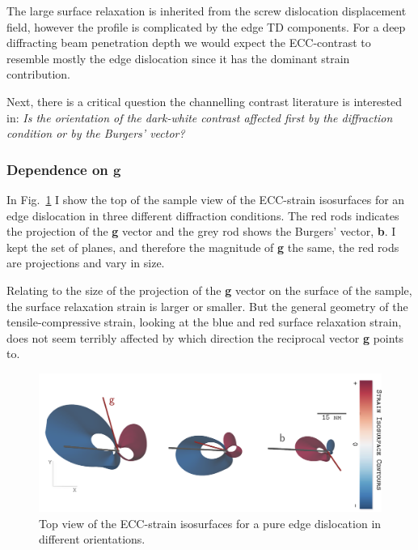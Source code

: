 The large surface relaxation is inherited from the screw dislocation displacement field, however the profile is complicated by the edge TD components. For a deep diffracting beam penetration depth we would expect the ECC-contrast to resemble mostly the edge dislocation since it has the dominant strain contribution. 


Next, there is a critical question the channelling contrast literature is interested in: \textit{Is the orientation of the dark-white contrast affected first by the diffraction condition or by the Burgers' vector?}

\subsubsection{Dependence on \texorpdfstring{$\mathbf{g}$}{g}}
In Fig.~\ref{fig:gdependence} I show the top of the sample view of the ECC-strain isosurfaces for an edge dislocation in three different diffraction conditions. The red rods indicates the projection of the \textbf{g} vector and the grey rod shows the Burgers' vector, \textbf{b}. I kept the set of planes, and therefore the magnitude of \textbf{g} the same, the red rods are projections and vary in size. 

Relating to the size of the projection of the \textbf{g} vector on the surface of the sample, the surface relaxation strain is larger or smaller. But the general geometry of the tensile-compressive strain, looking at the blue and red surface relaxation strain, does not seem terribly affected by which direction the reciprocal vector \textbf{g} points to. 

\begin{figure}[ht]
    \centering
    \includegraphics[width=0.95\linewidth]{Figures/gdependence.png}
    \caption[Screw TD ECCI-strain in different orientations.]{Top view of the ECC-strain isosurfaces for a pure edge dislocation in different orientations.  }
    \label{fig:gdependence}
\end{figure}

